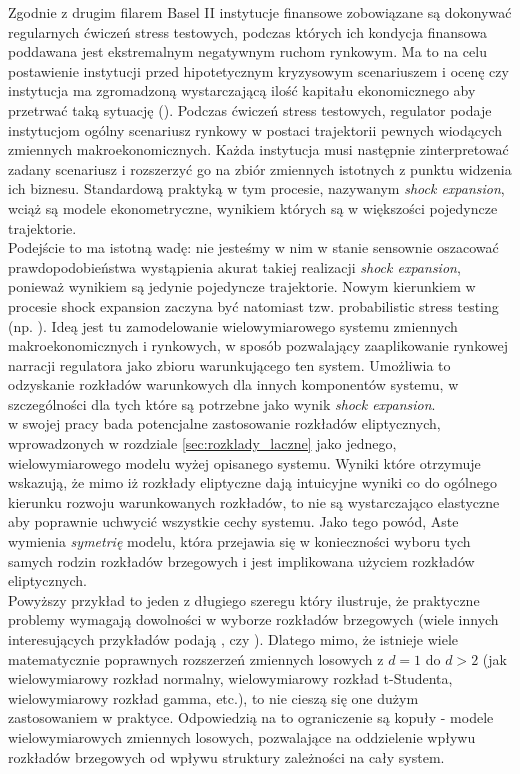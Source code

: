 Zgodnie z drugim filarem Basel II instytucje finansowe zobowiązane są dokonywać regularnych ćwiczeń stress testowych, podczas których ich kondycja finansowa poddawana jest ekstremalnym negatywnym ruchom rynkowym. Ma to na celu postawienie instytucji przed hipotetycznym kryzysowym scenariuszem i ocenę czy instytucja ma zgromadzoną wystarczającą ilość kapitału ekonomicznego aby przetrwać taką sytuację (\cite{BaselII}). Podczas ćwiczeń stress testowych, regulator podaje instytucjom ogólny scenariusz rynkowy w postaci trajektorii pewnych wiodących zmiennych makroekonomicznych. Każda instytucja musi następnie zinterpretować zadany scenariusz i rozszerzyć go na zbiór zmiennych istotnych z punktu widzenia ich biznesu. Standardową praktyką w tym procesie, nazywanym \emph{shock expansion}, wciąż są modele ekonometryczne, wynikiem których są w większości pojedyncze trajektorie. \cite{Siddique_Stress_testing}\\
Podejście to ma istotną wadę: nie jesteśmy w nim w stanie sensownie oszacować prawdopodobieństwa wystąpienia akurat takiej realizacji \emph{shock expansion}, ponieważ wynikiem są jedynie pojedyncze trajektorie. Nowym kierunkiem w procesie shock expansion zaczyna być natomiast tzw. probabilistic stress testing (np. \cite{Aste_Probabilistic_Stress_Testing}). Ideą jest tu zamodelowanie wielowymiarowego systemu zmiennych makroekonomicznych i rynkowych, w sposób pozwalający zaaplikowanie rynkowej narracji regulatora jako zbioru warunkującego ten system. Umożliwia to odzyskanie rozkładów warunkowych dla innych komponentów systemu, w szczególności dla tych które są potrzebne jako wynik \emph{shock expansion}.\\
\cite{Aste_Probabilistic_Stress_Testing} w swojej pracy bada potencjalne zastosowanie rozkładów eliptycznych, wprowadzonych w rozdziale \ref{sec:rozklady_laczne} jako jednego, wielowymiarowego modelu wyżej opisanego systemu. Wyniki które otrzymuje wskazują, że mimo iż rozkłady eliptyczne dają intuicyjne wyniki co do ogólnego kierunku rozwoju warunkowanych rozkładów, to nie są wystarczająco elastyczne aby poprawnie uchwycić wszystkie cechy systemu. Jako tego powód, Aste wymienia \textit{symetrię} modelu, która przejawia się w konieczności wyboru tych samych rodzin rozkładów brzegowych i jest implikowana użyciem rozkładów eliptycznych.\\

Powyższy przykład to jeden z długiego szeregu który ilustruje, że praktyczne problemy wymagają dowolności w wyborze rozkładów brzegowych (wiele innych interesujących przykładów podają \cite{Cherubini_Copula_Methods_in_Finance}, czy \cite{Cherubini_Dynamic_Copula_Methods_in_Finance}). Dlatego mimo, że istnieje wiele matematycznie poprawnych rozszerzeń zmiennych losowych z $d=1$ do $d>2$ (jak wielowymiarowy rozkład normalny, wielowymiarowy rozkład t-Studenta, wielowymiarowy rozkład gamma, etc.), to nie cieszą się one dużym zastosowaniem w praktyce. Odpowiedzią na to ograniczenie są kopuły - modele wielowymiarowych zmiennych losowych, pozwalające na oddzielenie wpływu rozkładów brzegowych od wpływu struktury zależności na cały system.\\
